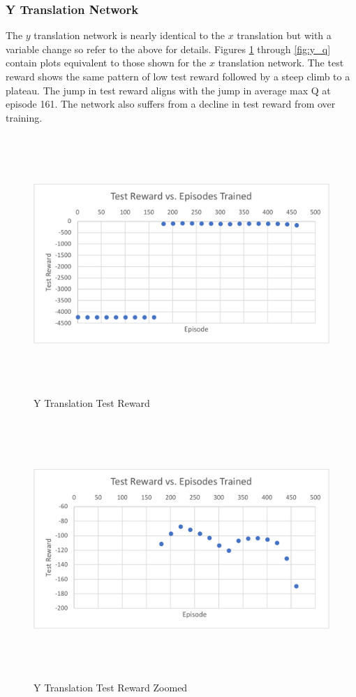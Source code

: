 \subsubsection{Y Translation Network}
The $y$ translation network is nearly identical to the $x$ translation but with a variable change so refer to the above for details. Figures \ref{fig:y_r} through \ref{fig:y_q} contain plots equivalent to those shown for the $x$ translation network. The test reward shows the same pattern of low test reward followed by a steep climb to a plateau. The jump in test reward aligns with the jump in average max Q at episode 161. The network also suffers from a decline in test reward from over training.
\begin{figure}[H]
	\centering
	\includegraphics[width=6in, height=3.85in, keepaspectratio]{figures/train_figs/y_r.pdf}
	\caption{Y Translation Test Reward} \label{fig:y_r}
\end{figure}
\begin{figure}[H]
	\centering
	\includegraphics[width=6in, height=3.85in, keepaspectratio]{figures/train_figs/y_rzoom.pdf}
	\caption{Y Translation Test Reward Zoomed} \label{fig:y_rzoom}
\end{figure}
